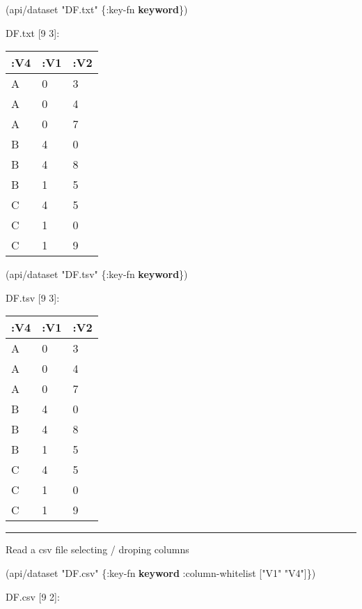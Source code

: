 \documentclass[]{article}
\newenvironment{Shaded}{\begin{snugshade}}{\end{snugshade}}
\newcommand{\KeywordTok}[1]{\textcolor[rgb]{0.13,0.29,0.53}{\textbf{#1}}}
\newcommand{\StringTok}[1]{\textcolor[rgb]{0.31,0.60,0.02}{#1}}
\newcommand{\AttributeTok}[1]{\textcolor[rgb]{0.77,0.63,0.00}{#1}}
\newcommand{\NormalTok}[1]{#1}
\begin{document}
\begin{Shaded}
\begin{Highlighting}[]
\NormalTok{(api/dataset }\StringTok{"DF.txt"}\NormalTok{ \{}\AttributeTok{:key-fn} \KeywordTok{keyword}\NormalTok{\})}
\end{Highlighting}
\end{Shaded}

DF.txt {[}9 3{]}:

\begin{longtable}[]{@{}lll@{}}
\toprule
:V4 & :V1 & :V2\tabularnewline
\midrule
\endhead
A & 0 & 3\tabularnewline
A & 0 & 4\tabularnewline
A & 0 & 7\tabularnewline
B & 4 & 0\tabularnewline
B & 4 & 8\tabularnewline
B & 1 & 5\tabularnewline
C & 4 & 5\tabularnewline
C & 1 & 0\tabularnewline
C & 1 & 9\tabularnewline
\bottomrule
\end{longtable}

\begin{Shaded}
\begin{Highlighting}[]
\NormalTok{(api/dataset }\StringTok{"DF.tsv"}\NormalTok{ \{}\AttributeTok{:key-fn} \KeywordTok{keyword}\NormalTok{\})}
\end{Highlighting}
\end{Shaded}

DF.tsv {[}9 3{]}:

\begin{longtable}[]{@{}lll@{}}
\toprule
:V4 & :V1 & :V2\tabularnewline
\midrule
\endhead
A & 0 & 3\tabularnewline
A & 0 & 4\tabularnewline
A & 0 & 7\tabularnewline
B & 4 & 0\tabularnewline
B & 4 & 8\tabularnewline
B & 1 & 5\tabularnewline
C & 4 & 5\tabularnewline
C & 1 & 0\tabularnewline
C & 1 & 9\tabularnewline
\bottomrule
\end{longtable}

\begin{center}\rule{0.5\linewidth}{0.5pt}\end{center}

Read a csv file selecting / droping columns

\begin{Shaded}
\begin{Highlighting}[]
\NormalTok{(api/dataset }\StringTok{"DF.csv"}\NormalTok{ \{}\AttributeTok{:key-fn} \KeywordTok{keyword}
                       \AttributeTok{:column-whitelist}\NormalTok{ [}\StringTok{"V1"} \StringTok{"V4"}\NormalTok{]\})}
\end{Highlighting}
\end{Shaded}

DF.csv {[}9 2{]}:
\end{document}
